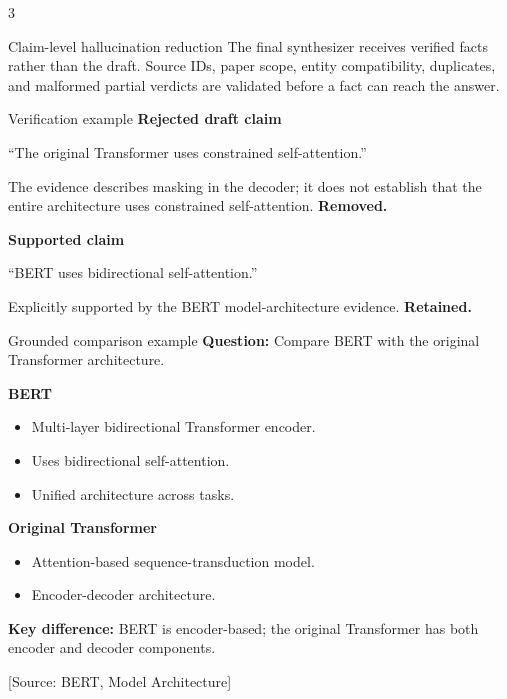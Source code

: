 \documentclass[a0,portrait]{a0poster}
\begin{document}
\begin{multicols}{3}
\begin{posterbox}{Claim-level hallucination reduction}
The final synthesizer receives verified facts rather than the draft. Source IDs,
paper scope, entity compatibility, duplicates, and malformed partial verdicts
are validated before a fact can reach the answer.
\end{posterbox}

\begin{posterbox}{Verification example}
\textbf{Rejected draft claim}\par
\begin{tcolorbox}[colback=PosterRed!6,colframe=PosterRed,arc=3mm]
``The original Transformer uses constrained self-attention.''
\end{tcolorbox}
The evidence describes masking in the decoder; it does not establish that the
entire architecture uses constrained self-attention. \textbf{Removed.}

\vspace{3mm}
\textbf{Supported claim}\par
\begin{tcolorbox}[colback=PosterCyan!7,colframe=PosterCyan,arc=3mm]
``BERT uses bidirectional self-attention.''
\end{tcolorbox}
Explicitly supported by the BERT model-architecture evidence. \textbf{Retained.}
\end{posterbox}

\begin{posterbox}{Grounded comparison example}
\textbf{Question:} Compare BERT with the original Transformer architecture.

\textbf{BERT}
\begin{itemize}
  \item Multi-layer bidirectional Transformer encoder.
  \item Uses bidirectional self-attention.
  \item Unified architecture across tasks.
\end{itemize}

\textbf{Original Transformer}
\begin{itemize}
  \item Attention-based sequence-transduction model.
  \item Encoder-decoder architecture.
\end{itemize}

\textbf{Key difference:} BERT is encoder-based; the original Transformer has
both encoder and decoder components.

{\small\color{PosterBlue}[Source: BERT, Model Architecture]}
\end{posterbox}


\end{multicols}
\end{document}
